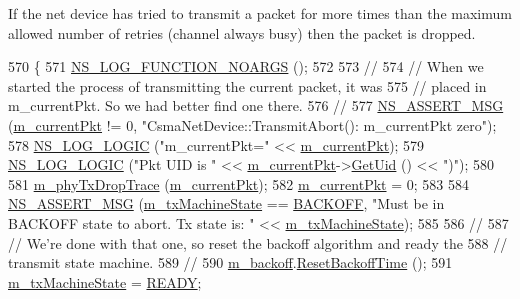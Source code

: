 If the net device has tried to transmit a packet for more times than the maximum allowed number of retries (channel always busy) then the packet is dropped. 
\begin{DoxyCode}
570 \{
571   \hyperlink{log-macros-disabled_8h_a8f7e4afc291c9d29a65c18ac1f79197b}{NS\_LOG\_FUNCTION\_NOARGS} ();
572 
573   \textcolor{comment}{//}
574   \textcolor{comment}{// When we started the process of transmitting the current packet, it was }
575   \textcolor{comment}{// placed in m\_currentPkt.  So we had better find one there.}
576   \textcolor{comment}{//}
577   \hyperlink{assert_8h_aff5ece9066c74e681e74999856f08539}{NS\_ASSERT\_MSG} (\hyperlink{classns3_1_1CsmaNetDevice_a83f2aa389f676dec6bd1ff056bd61942}{m\_currentPkt} != 0, \textcolor{stringliteral}{"CsmaNetDevice::TransmitAbort(): m\_currentPkt
       zero"});
578   \hyperlink{group__logging_ga88acd260151caf2db9c0fc84997f45ce}{NS\_LOG\_LOGIC} (\textcolor{stringliteral}{"m\_currentPkt="} << \hyperlink{classns3_1_1CsmaNetDevice_a83f2aa389f676dec6bd1ff056bd61942}{m\_currentPkt});
579   \hyperlink{group__logging_ga88acd260151caf2db9c0fc84997f45ce}{NS\_LOG\_LOGIC} (\textcolor{stringliteral}{"Pkt UID is "} << \hyperlink{classns3_1_1CsmaNetDevice_a83f2aa389f676dec6bd1ff056bd61942}{m\_currentPkt}->\hyperlink{classns3_1_1Packet_a1f212c825b50e54d94f5b9ae99592e6a}{GetUid} () << \textcolor{stringliteral}{")"});
580 
581   \hyperlink{classns3_1_1CsmaNetDevice_ad2a07cf80f83d9ce17d9280775e9a1f8}{m\_phyTxDropTrace} (\hyperlink{classns3_1_1CsmaNetDevice_a83f2aa389f676dec6bd1ff056bd61942}{m\_currentPkt});
582   \hyperlink{classns3_1_1CsmaNetDevice_a83f2aa389f676dec6bd1ff056bd61942}{m\_currentPkt} = 0;
583 
584   \hyperlink{assert_8h_aff5ece9066c74e681e74999856f08539}{NS\_ASSERT\_MSG} (\hyperlink{classns3_1_1CsmaNetDevice_af07031cad3f8bd8c4b33ba77fa706e99}{m\_txMachineState} == \hyperlink{classns3_1_1CsmaNetDevice_a46c532357164a954c46a01f05f8d78f4a415034117cf23985cd8d3481944cd731}{BACKOFF}, \textcolor{stringliteral}{"Must be in BACKOFF state
       to abort.  Tx state is: "} << \hyperlink{classns3_1_1CsmaNetDevice_af07031cad3f8bd8c4b33ba77fa706e99}{m\_txMachineState});
585 
586   \textcolor{comment}{// }
587   \textcolor{comment}{// We're done with that one, so reset the backoff algorithm and ready the}
588   \textcolor{comment}{// transmit state machine.}
589   \textcolor{comment}{//}
590   \hyperlink{classns3_1_1CsmaNetDevice_a2cb5f9baf0a19a7ea6527002b0299403}{m\_backoff}.\hyperlink{classns3_1_1Backoff_a103dc910a4f81c7444e873be3d055237}{ResetBackoffTime} ();
591   \hyperlink{classns3_1_1CsmaNetDevice_af07031cad3f8bd8c4b33ba77fa706e99}{m\_txMachineState} = \hyperlink{classns3_1_1CsmaNetDevice_a46c532357164a954c46a01f05f8d78f4a50a4f4ac7775f95f3ec1d4624213bee2}{READY};

\end{DoxyCode}

